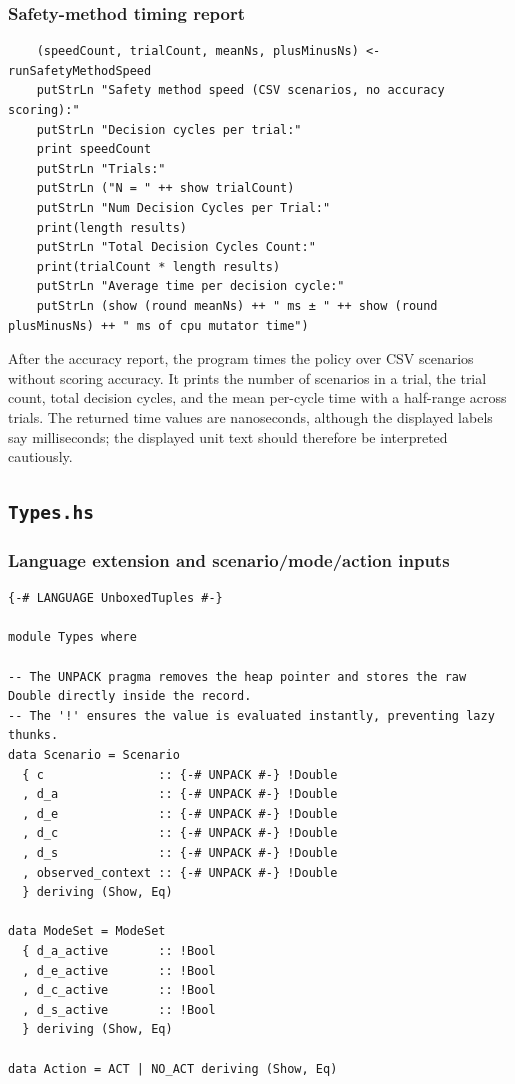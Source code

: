 \documentclass[11pt]{article}
\begin{document}
\subsubsection{Safety-method timing report}

\begin{lstlisting}
    (speedCount, trialCount, meanNs, plusMinusNs) <- runSafetyMethodSpeed
    putStrLn "Safety method speed (CSV scenarios, no accuracy scoring):"
    putStrLn "Decision cycles per trial:"
    print speedCount
    putStrLn "Trials:"
    putStrLn ("N = " ++ show trialCount)
    putStrLn "Num Decision Cycles per Trial:"
    print(length results)
    putStrLn "Total Decision Cycles Count:"
    print(trialCount * length results)
    putStrLn "Average time per decision cycle:"
    putStrLn (show (round meanNs) ++ " ms ± " ++ show (round plusMinusNs) ++ " ms of cpu mutator time")
\end{lstlisting}

After the accuracy report, the program times the policy over CSV scenarios
without scoring accuracy. It prints the number of scenarios in a trial, the
trial count, total decision cycles, and the mean per-cycle time with a
half-range across trials. The returned time values are nanoseconds, although
the displayed labels say milliseconds; the displayed unit text should
therefore be interpreted cautiously.

\subsection{\texttt{Types.hs}}

\subsubsection{Language extension and scenario/mode/action inputs}

\begin{lstlisting}
{-# LANGUAGE UnboxedTuples #-}

module Types where

-- The UNPACK pragma removes the heap pointer and stores the raw Double directly inside the record.
-- The '!' ensures the value is evaluated instantly, preventing lazy thunks.
data Scenario = Scenario
  { c                :: {-# UNPACK #-} !Double
  , d_a              :: {-# UNPACK #-} !Double
  , d_e              :: {-# UNPACK #-} !Double
  , d_c              :: {-# UNPACK #-} !Double
  , d_s              :: {-# UNPACK #-} !Double
  , observed_context :: {-# UNPACK #-} !Double
  } deriving (Show, Eq)

data ModeSet = ModeSet
  { d_a_active       :: !Bool
  , d_e_active       :: !Bool
  , d_c_active       :: !Bool
  , d_s_active       :: !Bool
  } deriving (Show, Eq)

data Action = ACT | NO_ACT deriving (Show, Eq)
\end{lstlisting}
\end{document}
